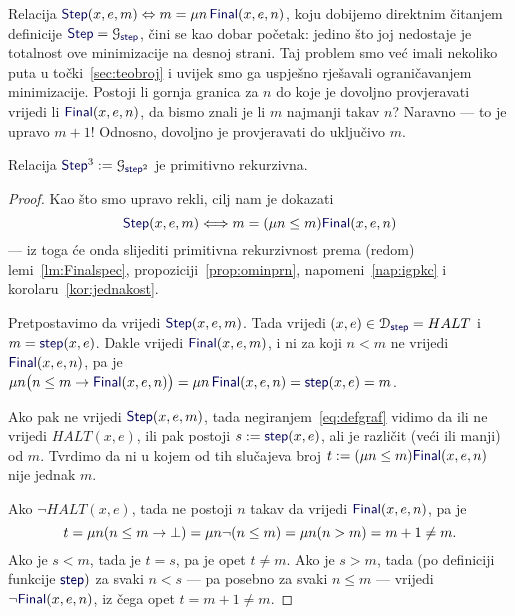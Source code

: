 Relacija $\f{Step}(x,e,m)\Leftrightarrow m= \mu n\,\f{Final}(x,e,n)$, koju dobijemo direktnim čitanjem definicije $\f{Step}=\graf{\f{step}}$, čini se kao dobar početak: jedino što joj nedostaje je totalnost ove minimizacije na desnoj strani. Taj problem smo već imali nekoliko puta u točki~\ref{sec:teobroj} i uvijek smo ga uspješno rješavali ograničavanjem minimizacije. Postoji li gornja granica za $n$ do koje je dovoljno provjeravati vrijedi li $\f{Final}(x,e,n)$, da bismo znali je li $m$ najmanji takav $n$? Naravno --- to je upravo $m+1$! Odnosno, dovoljno je provjeravati do uključivo $m$.

\begin{lema}[{name=[primitivna rekurzivnost grafa brojenja koraka do zaustavljanja]}]
Relacija $\f{Step}^3:=\graf{\f{step}^2}$ je primitivno rekurzivna.
\end{lema}
\begin{proof}
Kao što smo upravo rekli, cilj nam je dokazati
\begin{equation}
    \f{Step}(x,e,m)\Longleftrightarrow m=(\mu n\le m)\f{Final}(x,e,n)
\end{equation}
--- iz toga će onda slijediti primitivna rekurzivnost prema (redom) lemi~\ref{lm:Finalspec}, propoziciji~\ref{prop:ominprn}, napomeni~\ref{nap:igpkc} i korolaru~\ref{kor:jednakost}.

Pretpostavimo da vrijedi $\f{Step}(x,e,m)$. Tada vrijedi $(x,e)\in\dom{\f{step}}=HALT$ i $m=\f{step}(x,e)$. Dakle vrijedi $\f{Final}(x,e,m)$, i ni za koji $n<m$ ne vrijedi $\f{Final}(x,e,n)$, pa je $\mu n\bigl(n\le m\to\f{Final}(x,e,n)\bigr)=\mu n\,\f{Final}(x,e,n)=\f{step}(x,e)=m$.

Ako pak ne vrijedi $\f{Step}(x,e,m)$, tada negiranjem~\eqref{eq:defgraf} vidimo da ili ne vrijedi $HALT(x,e)$, ili pak postoji $s:=\f{step}(x,e)$, ali je različit (veći ili manji) od $m$. Tvrdimo da ni u kojem od tih slučajeva broj $t:=(\mu n\le m)\f{Final}(x,e,n)$ nije jednak $m$.

Ako $\lnot HALT(x,e)$, tada ne postoji $n$ takav da vrijedi $\f{Final}(x,e,n)$, pa je
\begin{equation}
    t = \mu n(n\le m\to\bot)=\mu n\lnot(n\le m)=\mu n(n>m)= m+1\ne m\text.
\end{equation}
Ako je $s<m$, tada je $t=s$, pa je opet $t\ne m$. Ako je $s>m$, tada (po definiciji funkcije $\f{step})$ za svaki $n<s$ --- pa posebno za svaki $n\le m$ --- vrijedi $\lnot\f{Final}(x,e,n)$, iz čega opet $t=m+1\ne m$.
\end{proof}

